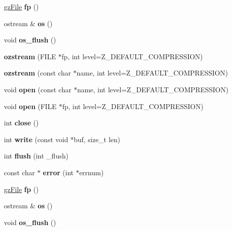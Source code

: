 \begin{DoxyCompactItemize}
\mbox{\label{classozstream_ab1743675ebfa7173c06f803f41844b18}} 
\hyperlink{structgz_file__s}{gz\+File} {\bfseries fp} ()
\item 
\mbox{\label{classozstream_acbbb07b71280b24534fc6e0ca8366ae2}} 
ostream \& {\bfseries os} ()
\item 
\mbox{\label{classozstream_aa65b61b59ad9d43f3f35095cb353f57f}} 
void {\bfseries os\+\_\+flush} ()
\item 
\mbox{\label{classozstream_add8c121cdb4538f9f2de2d517c640e61}} 
{\bfseries ozstream} (F\+I\+LE $\ast$fp, int level=Z\+\_\+\+D\+E\+F\+A\+U\+L\+T\+\_\+\+C\+O\+M\+P\+R\+E\+S\+S\+I\+ON)
\item 
\mbox{\label{classozstream_af30abfcf07fef0000c7fd3e4ab89eb85}} 
{\bfseries ozstream} (const char $\ast$name, int level=Z\+\_\+\+D\+E\+F\+A\+U\+L\+T\+\_\+\+C\+O\+M\+P\+R\+E\+S\+S\+I\+ON)
\item 
\mbox{\label{classozstream_aea598e6f8f3bb1ffff903546d98b14f0}} 
void {\bfseries open} (const char $\ast$name, int level=Z\+\_\+\+D\+E\+F\+A\+U\+L\+T\+\_\+\+C\+O\+M\+P\+R\+E\+S\+S\+I\+ON)
\item 
\mbox{\label{classozstream_aa5ccfff4546c31dd1f9cd78ad02d446f}} 
void {\bfseries open} (F\+I\+LE $\ast$fp, int level=Z\+\_\+\+D\+E\+F\+A\+U\+L\+T\+\_\+\+C\+O\+M\+P\+R\+E\+S\+S\+I\+ON)
\item 
\mbox{\label{classozstream_a1f5bf09289fa67b17e768435cf4f01f1}} 
int {\bfseries close} ()
\item 
\mbox{\label{classozstream_a2dbcc101aa6e94eb2ca866e9b8db4c84}} 
int {\bfseries write} (const void $\ast$buf, size\+\_\+t len)
\item 
\mbox{\label{classozstream_a0fc1b5181044b8d6b6aed0381e8f449c}} 
int {\bfseries flush} (int \+\_\+flush)
\item 
\mbox{\label{classozstream_a189c85676e712ba4776bb17e1de22388}} 
const char $\ast$ {\bfseries error} (int $\ast$errnum)
\item 
\mbox{\label{classozstream_ab1743675ebfa7173c06f803f41844b18}} 
\hyperlink{structgz_file__s}{gz\+File} {\bfseries fp} ()
\item 
\mbox{\label{classozstream_acbbb07b71280b24534fc6e0ca8366ae2}} 
ostream \& {\bfseries os} ()
\item 
\mbox{\label{classozstream_aa65b61b59ad9d43f3f35095cb353f57f}} 
void {\bfseries os\+\_\+flush} ()
\end{DoxyCompactItemize}


